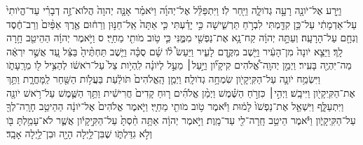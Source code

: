 \documentclass{openreader}
\begin{document}
וַיֵּ֥רַע אֶל־יֹונָ֖ה רָעָ֣ה גְדֹולָ֑ה וַיִּ֖חַר לֹֽו׃ וַיִּתְפַּלֵּ֨ל אֶל־יְהוָ֜ה וַיֹּאמַ֗ר אָנָּ֤ה יְהוָה֙ הֲלֹוא־זֶ֣ה דְבָרִ֗י עַד־הֱיֹותִי֙ עַל־אַדְמָתִ֔י עַל־כֵּ֥ן קִדַּ֖מְתִּי לִבְרֹ֣חַ תַּרְשִׁ֑ישָׁה כִּ֣י יָדַ֗עְתִּי כִּ֤י אַתָּה֙ אֵֽל־חַנּ֣וּן וְרַח֔וּם אֶ֤רֶךְ אַפַּ֨יִם֙ וְרַב־חֶ֔סֶד וְנִחָ֖ם עַל־הָרָעָֽה׃ וְעַתָּ֣ה יְהוָ֔ה קַח־נָ֥א אֶת־נַפְשִׁ֖י מִמֶּ֑נִּי כִּ֛י טֹ֥וב מֹותִ֖י מֵחַיָּֽי׃ ס וַיֹּ֣אמֶר יְהוָ֔ה הַהֵיטֵ֖ב חָ֥רָה לָֽךְ׃ וַיֵּצֵ֤א יֹונָה֙ מִן־הָעִ֔יר וַיֵּ֖שֶׁב מִקֶּ֣דֶם לָעִ֑יר וַיַּעַשׂ֩ לֹ֨ו שָׁ֜ם סֻכָּ֗ה וַיֵּ֤שֶׁב תַּחְתֶּ֨יהָ֙ בַּצֵּ֔ל עַ֚ד אֲשֶׁ֣ר יִרְאֶ֔ה מַה־יִּהְיֶ֖ה בָּעִֽיר׃ וַיְמַ֣ן יְהוָֽה־אֱ֠לֹהִים קִיקָיֹ֞ון וַיַּ֣עַל׀ מֵעַ֣ל לְיֹונָ֗ה לִֽהְיֹ֥ות צֵל֙ עַל־רֹאשֹׁ֔ו לְהַצִּ֥יל לֹ֖ו מֵרָֽעָתֹ֑ו וַיִּשְׂמַ֥ח יֹונָ֛ה עַל־הַקִּֽיקָיֹ֖ון שִׂמְחָ֥ה גְדֹולָֽה׃ וַיְמַ֤ן הָֽאֱלֹהִים֙ תֹּולַ֔עַת בַּעֲלֹ֥ות הַשַּׁ֖חַר לַֽמָּחֳרָ֑ת וַתַּ֥ךְ אֶת־הַקִּֽיקָיֹ֖ון וַיִּיבָֽשׁ׃ וַיְהִ֣י׀ כִּזְרֹ֣חַ הַשֶּׁ֗מֶשׁ וַיְמַ֨ן אֱלֹהִ֜ים ר֤וּחַ קָדִים֙ חֲרִישִׁ֔ית וַתַּ֥ךְ הַשֶּׁ֛מֶשׁ עַל־רֹ֥אשׁ יֹונָ֖ה וַיִּתְעַלָּ֑ף וַיִּשְׁאַ֤ל אֶת־נַפְשֹׁו֙ לָמ֔וּת וַיֹּ֕אמֶר טֹ֥וב מֹותִ֖י מֵחַיָּֽי׃ וַיֹּ֤אמֶר אֱלֹהִים֙ אֶל־יֹונָ֔ה הַהֵיטֵ֥ב חָרָֽה־לְךָ֖ עַל־הַקִּֽיקָיֹ֑ון וַיֹּ֕אמֶר הֵיטֵ֥ב חָֽרָה־לִ֖י עַד־מָֽוֶת׃ וַיֹּ֣אמֶר יְהוָ֔ה אַתָּ֥ה חַ֨סְתָּ֙ עַל־הַקִּ֣יקָיֹ֔ון אֲשֶׁ֛ר לֹא־עָמַ֥לְתָּ בֹּ֖ו וְלֹ֣א גִדַּלְתֹּ֑ו שֶׁבִּן־לַ֥יְלָה הָיָ֖ה וּבִן־לַ֥יְלָה אָבָֽד׃ 
\end{document}
